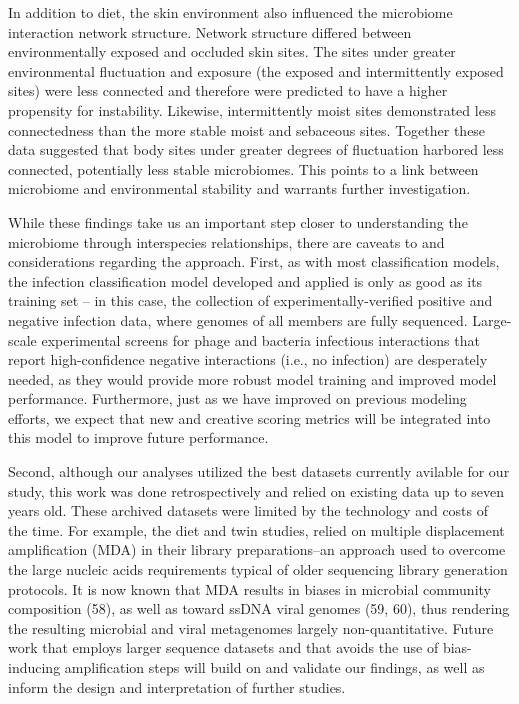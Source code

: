 \documentclass[12pt,]{article}
\begin{document}
In addition to diet, the skin environment also influenced the microbiome
interaction network structure. Network structure differed between
environmentally exposed and occluded skin sites. The sites under greater
environmental fluctuation and exposure (the exposed and intermittently
exposed sites) were less connected and therefore were predicted to have
a higher propensity for instability. Likewise, intermittently moist
sites demonstrated less connectedness than the more stable moist and
sebaceous sites. Together these data suggested that body sites under
greater degrees of fluctuation harbored less connected, potentially less
stable microbiomes. This points to a link between microbiome and
environmental stability and warrants further investigation.

While these findings take us an important step closer to understanding
the microbiome through interspecies relationships, there are caveats to
and considerations regarding the approach. First, as with most
classification models, the infection classification model developed and
applied is only as good as its training set -- in this case, the
collection of experimentally-verified positive and negative infection
data, where genomes of all members are fully sequenced. Large-scale
experimental screens for phage and bacteria infectious interactions that
report high-confidence negative interactions (i.e., no infection) are
desperately needed, as they would provide more robust model training and
improved model performance. Furthermore, just as we have improved on
previous modeling efforts, we expect that new and creative scoring
metrics will be integrated into this model to improve future
performance.

Second, although our analyses utilized the best datasets currently
avilable for our study, this work was done retrospectively and relied on
existing data up to seven years old. These archived datasets were
limited by the technology and costs of the time. For example, the diet
and twin studies, relied on multiple displacement amplification (MDA) in
their library preparations--an approach used to overcome the large
nucleic acids requirements typical of older sequencing library
generation protocols. It is now known that MDA results in biases in
microbial community composition (58), as well as toward ssDNA viral
genomes (59, 60), thus rendering the resulting microbial and viral
metagenomes largely non-quantitative. Future work that employs larger
sequence datasets and that avoids the use of bias-inducing amplification
steps will build on and validate our findings, as well as inform the
design and interpretation of further studies.
\end{document}
